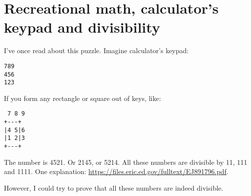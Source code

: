 \section{Recreational math, calculator's keypad and divisibility}

I've once read about this puzzle.
Imagine calculator's keypad:

\begin{lstlisting}
789
456
123
\end{lstlisting}

If you form any rectangle or square out of keys, like:

\begin{lstlisting}
 7 8 9
+---+
|4 5|6
|1 2|3
+---+
\end{lstlisting}

The number is 4521. Or 2145, or 5214.
All these numbers are divisible by 11, 111 and 1111.
One explanation: \url{https://files.eric.ed.gov/fulltext/EJ891796.pdf}.

However, I could try to prove that all these numbers are indeed divisible.

